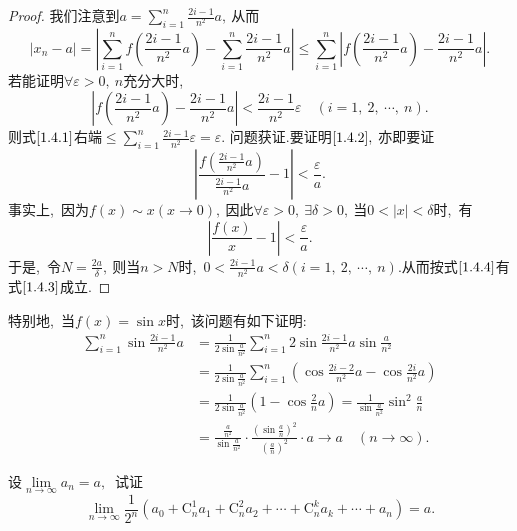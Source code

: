 \begin{proof}
	我们注意到$a=\sum\limits_{i=1}^{n}\frac{2i-1}{n^2}a,\ $从而
	\begin{equation}
		|x_n-a|=\left|\sum_{i=1}^{n}f\left(\frac{2i-1}{n^2}a\right)-\sum_{i=1}^{n}\frac{2i-1}{n^2}a\right|\leqslant\sum_{i=1}^{n}\left|f\left(\frac{2i-1}{n^2}a\right)-\frac{2i-1}{n^2}a\right|.\label{1.4.1}
	\end{equation}
	若能证明$\forall\varepsilon>0,\ n$充分大时,\ 
	\begin{equation}
		\left|f\left(\frac{2i-1}{n^2}a\right)-\frac{2i-1}{n^2}a\right|<\frac{2i-1}{n^2}\varepsilon\quad(i=1,\ 2,\ \cdots,\ n).\label{1.4.2}
	\end{equation}
	则式$\eqref{1.4.1}$右端$\leqslant\sum\limits_{i=1}^{n}\frac{2i-1}{n^2}\varepsilon=\varepsilon.$
	问题获证.要证明$\eqref{1.4.2},\ $亦即要证
	\begin{equation}
		\left|\frac{f\left(\frac{2i-1}{n^2}a\right)}{\frac{2i-1}{n^2}a}-1\right|<\frac{\varepsilon}{a}.\label{1.4.3}
	\end{equation}
	事实上,\ 因为$f(x)\sim x(x\rightarrow 0),\ $因此$\forall\varepsilon>0,\ \exists \delta>0,\ $当$0<|x|<\delta$时,\ 有
	\begin{equation}
		\left|\frac{f(x)}{x}-1\right|<\frac{\varepsilon}{a}.\label{1.4.4}
	\end{equation}
	于是,\ 令$N=\frac{2a}{\delta},\ $则当$n>N$时,\ $0<\frac{2i-1}{n^2}a<\delta(i=1,\ 2,\ \cdots,\ n).$从而按式$\eqref{1.4.4}$有式$\eqref{1.4.3}$成立.
\end{proof}
\begin{note}
	特别地,\ 当$f(x)=\sin x$时,\ 该问题有如下证明:
	$$\begin{aligned}
		\sum_{i=1}^{n}\sin\frac{2i-1}{n^2}a&=\frac{1}{2\sin\frac{a}{n^2}}\sum_{i=1}^{n}2\sin\frac{2i-1}{n^2}a\sin\frac{a}{n^2}\\
		&=\frac{1}{2\sin\frac{a}{n^2}}\sum_{i=1}^{n}\left(\cos\frac{2i-2}{n^2}a-\cos\frac{2i}{n^2}a\right)\\
		&=\frac{1}{2\sin\frac{a}{n^2}}\left(1-\cos\frac{2}{n}a\right)=\frac{1}{\sin\frac{a}{n^2}}\sin^2\frac{a}{n}\\
		&=\frac{\frac{a}{n^2}}{\sin\frac{a}{n^2}}\cdot\frac{\left(\sin\frac{a}{n}\right)^2}{\left(\frac{a}{n}\right)^2}\cdot a\rightarrow a\quad(n\rightarrow\infty).
	\end{aligned}$$
\end{note}
\newpage
\begin{problem}
	设$\lim\limits_{n \rightarrow \infty} a_{n}=a ,\ $ 试证
	$$\lim\limits_{n\rightarrow\infty}\frac{1}{2^n}(a_0+\mathrm{C}_n^1a_1+\mathrm{C}_n^2a_2+\cdots+\mathrm{C}_n^ka_k+\cdots+a_n)=a.$$
\end{problem}
